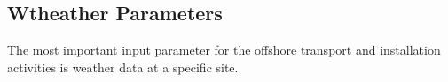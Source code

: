 \subsection{Wtheather Parameters}

The most important input parameter for the offshore transport and installation activities is weather data at a specific site. 